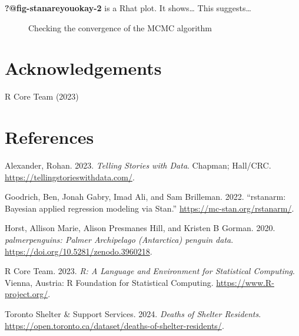 \documentclass[
  letterpaper,
  DIV=11,
  numbers=noendperiod]{scrartcl}
\newlength{\cslhangindent}
\newenvironment{CSLReferences}[2] %
 {\begin{list}{}{%
  \setlength{\itemindent}{0pt}
  \setlength{\leftmargin}{0pt}
  \setlength{\parsep}{0pt}
  \ifodd #1
   \setlength{\leftmargin}{\cslhangindent}
   \setlength{\itemindent}{-1\cslhangindent}
  \fi
  \setlength{\itemsep}{#2\baselineskip}}}
 {\end{list}}
\begin{document}
\textbf{?@fig-stanareyouokay-2} is a Rhat plot. It shows\ldots{} This
suggests\ldots{}

\begin{figure}

\begin{minipage}{0.50\linewidth}
Checking the convergence of the MCMC algorithm\end{minipage}%

\end{figure}%

\newpage

\section{Acknowledgements}\label{acknowledgements}

R Core Team (2023)

\section*{References}\label{references}

\label{refs}
\begin{CSLReferences}{1}{0}
Alexander, Rohan. 2023. \emph{Telling Stories with Data}. Chapman;
Hall/CRC. \url{https://tellingstorieswithdata.com/}.

Goodrich, Ben, Jonah Gabry, Imad Ali, and Sam Brilleman. 2022.
{``{rstanarm: {Bayesian} applied regression modeling via {Stan}}.''}
\url{https://mc-stan.org/rstanarm/}.

Horst, Allison Marie, Alison Presmanes Hill, and Kristen B Gorman. 2020.
\emph{{palmerpenguins: Palmer Archipelago (Antarctica) penguin data}}.
\url{https://doi.org/10.5281/zenodo.3960218}.

R Core Team. 2023. \emph{{R: A Language and Environment for Statistical
Computing}}. Vienna, Austria: R Foundation for Statistical Computing.
\url{https://www.R-project.org/}.

Toronto Shelter \& Support Services. 2024. \emph{Deaths of Shelter
Residents}.
\url{https://open.toronto.ca/dataset/deaths-of-shelter-residents/}.

\end{CSLReferences}
\end{document}

